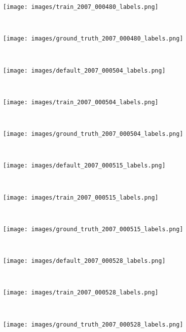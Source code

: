 \documentclass[10pt,twocolumn,letterpaper]{article}
\begin{document}
\begin{figure*}[t!]
\begin{subfigure}[t]{0.3\textwidth}
        \centering
        \texttt{[image: images/train\_2007\_000480\_labels.png]}
    \end{subfigure}
    ~
    \begin{subfigure}[t]{0.3\textwidth}
        \centering
        \texttt{[image: images/ground\_truth\_2007\_000480\_labels.png]}
    \end{subfigure} \\
    \begin{subfigure}[t]{0.3\textwidth}
        \centering
        \texttt{[image: images/default\_2007\_000504\_labels.png]}
    \end{subfigure}
    ~
    \begin{subfigure}[t]{0.3\textwidth}
        \centering
        \texttt{[image: images/train\_2007\_000504\_labels.png]}
    \end{subfigure}
    ~
    \begin{subfigure}[t]{0.3\textwidth}
        \centering
        \texttt{[image: images/ground\_truth\_2007\_000504\_labels.png]}
    \end{subfigure} \\
    \begin{subfigure}[t]{0.3\textwidth}
        \centering
        \texttt{[image: images/default\_2007\_000515\_labels.png]}
    \end{subfigure}
    ~
    \begin{subfigure}[t]{0.3\textwidth}
        \centering
        \texttt{[image: images/train\_2007\_000515\_labels.png]}
    \end{subfigure}
    ~
    \begin{subfigure}[t]{0.3\textwidth}
        \centering
        \texttt{[image: images/ground\_truth\_2007\_000515\_labels.png]}
    \end{subfigure} \\
    \begin{subfigure}[t]{0.3\textwidth}
        \centering
        \texttt{[image: images/default\_2007\_000528\_labels.png]}
    \end{subfigure}
    ~
    \begin{subfigure}[t]{0.3\textwidth}
        \centering
        \texttt{[image: images/train\_2007\_000528\_labels.png]}
    \end{subfigure}
    ~
    \begin{subfigure}[t]{0.3\textwidth}
        \centering
        \texttt{[image: images/ground\_truth\_2007\_000528\_labels.png]}

\end{subfigure}
\end{figure*}
\end{document}
